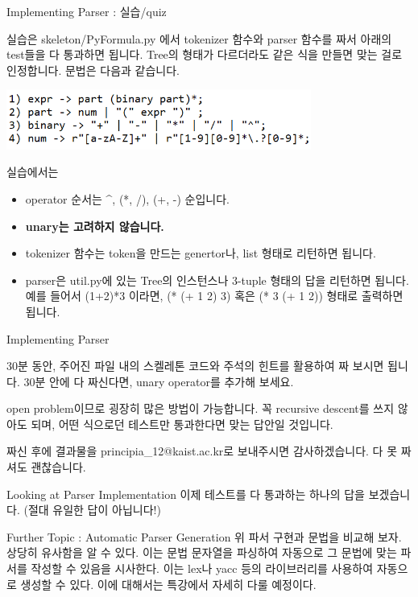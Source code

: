 \documentclass{beamer}
\begin{document}
\begin{frame}{Implementing Parser : 실습/quiz}
 
실습은 skeleton/PyFormula.py 에서 tokenizer 함수와 parser 함수를 짜서 아래의 test들을 다 통과하면 됩니다. Tree의 형태가 다르더라도 같은 식을 만들면 맞는 걸로 인정합니다. 문법은 다음과 같습니다. 

\includegraphics[width=10cm,keepaspectratio]{simplegrammar}

실습에서는 
\begin{itemize} 
\item operator 순서는 \textasciicircum, (*, /), (+, -) 순입니다. 
\item \textbf{unary는 고려하지 않습니다.}
\item tokenizer 함수는 token을 만드는 genertor나, list 형태로 리턴하면 됩니다. 
\item parser은 util.py에 있는 Tree의 인스턴스나 3-tuple 형태의 답을 리턴하면 됩니다. 예를 들어서 (1+2)*3 이라면, (* (+ 1 2) 3) 혹은 (* 3 (+ 1 2)) 형태로 출력하면 됩니다.
\end{itemize} 


\end{frame}

\begin{frame}{Implementing Parser}

30분 동안, 주어진 파일 내의 스켈레톤 코드와 주석의 힌트를 활용하여 짜 보시면 됩니다. 30분 안에 다 짜신다면, unary operator를 추가해 보세요. 

open problem이므로 굉장히 많은 방법이 가능합니다. 꼭 recursive descent를 쓰지 않아도 되며, 어떤 식으로던 테스트만 통과한다면 맞는 답안일 것입니다. 

짜신 후에 결과물을 principia\_12@kaist.ac.kr로 보내주시면 감사하겠습니다. 다 못 짜셔도 괜찮습니다. 
\end{frame}

\begin{frame}{Looking at Parser Implementation} 
이제 테스트를 다 통과하는 하나의 답을 보겠습니다. (절대 유일한 답이 아닙니다!) 
\end{frame} 

\begin{frame}{Further Topic : Automatic Parser Generation} 
위 파서 구현과 문법을 비교해 보자. 상당히 유사함을 알 수 있다. 이는 문법 문자열을 파싱하여 자동으로 그 문법에 맞는 파서를 작성할 수 있음을 시사한다. 이는 lex나 yacc 등의 라이브러리를 사용하여 자동으로 생성할 수 있다. 이에 대해서는 특강에서 자세히 다룰 예정이다. 
\end{frame}
\end{document}
